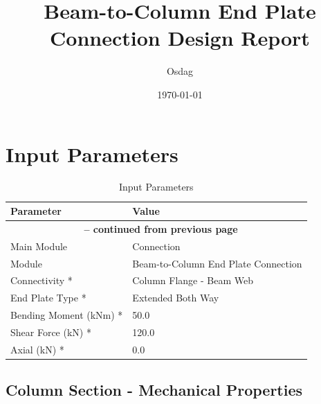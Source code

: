 \documentclass[12pt]{article}
\title{\textbf{Beam-to-Column End Plate Connection Design Report}}
\author{Osdag}
\date{\today}
\begin{document}
\maketitle




\tableofcontents
\newpage



\listoffigures
\newpage



\listoftables
\newpage


\section{Input Parameters}

\begin{longtable}{ll}
\caption{Input Parameters}
\label{tab:input}
Parameter & Value \\ \hline
\endfirsthead
\multicolumn{2}{c}{{\bfseries \tablename\ \thetable{} -- continued from previous page}} \\
\endhead
\endfoot
\endlastfoot
Main Module & Connection \\
\hline
Module & Beam-to-Column End Plate Connection \\
\hline
Connectivity * & Column Flange - Beam Web \\
\hline
End Plate Type * & Extended Both Way \\
\hline
Bending Moment (kNm) * & 50.0 \\
\hline
Shear Force (kN) * & 120.0 \\
\hline
Axial (kN) * & 0.0 \\
\hline
\end{longtable}

\subsection{Column Section - Mechanical Properties}
\end{document}
